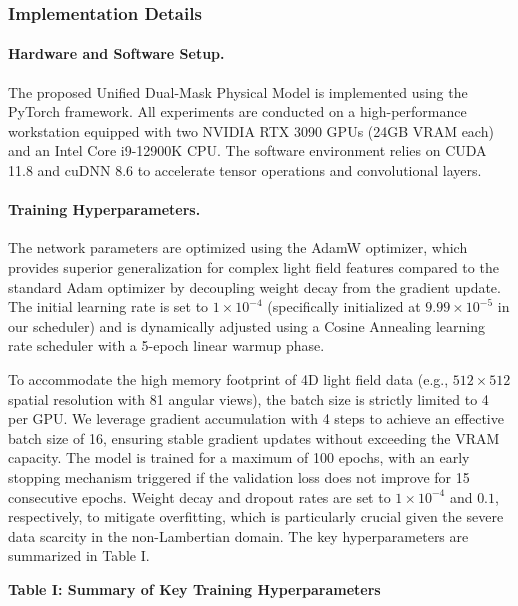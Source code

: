 \subsubsection{Implementation Details}

\paragraph{Hardware and Software Setup.}
The proposed Unified Dual-Mask Physical Model is implemented using the PyTorch framework. All experiments are conducted on a high-performance workstation equipped with two NVIDIA RTX 3090 GPUs (24GB VRAM each) and an Intel Core i9-12900K CPU. The software environment relies on CUDA 11.8 and cuDNN 8.6 to accelerate tensor operations and convolutional layers. 

\paragraph{Training Hyperparameters.}
The network parameters are optimized using the AdamW optimizer, which provides superior generalization for complex light field features compared to the standard Adam optimizer by decoupling weight decay from the gradient update. The initial learning rate is set to $1 \times 10^{-4}$ (specifically initialized at $9.99 \times 10^{-5}$ in our scheduler) and is dynamically adjusted using a Cosine Annealing learning rate scheduler with a 5-epoch linear warmup phase. 

To accommodate the high memory footprint of 4D light field data (e.g., $512 \times 512$ spatial resolution with 81 angular views), the batch size is strictly limited to 4 per GPU. We leverage gradient accumulation with 4 steps to achieve an effective batch size of 16, ensuring stable gradient updates without exceeding the VRAM capacity. The model is trained for a maximum of 100 epochs, with an early stopping mechanism triggered if the validation loss does not improve for 15 consecutive epochs. Weight decay and dropout rates are set to $1 \times 10^{-4}$ and $0.1$, respectively, to mitigate overfitting, which is particularly crucial given the severe data scarcity in the non-Lambertian domain. The key hyperparameters are summarized in Table I.

\textbf{Table I: Summary of Key Training Hyperparameters}

